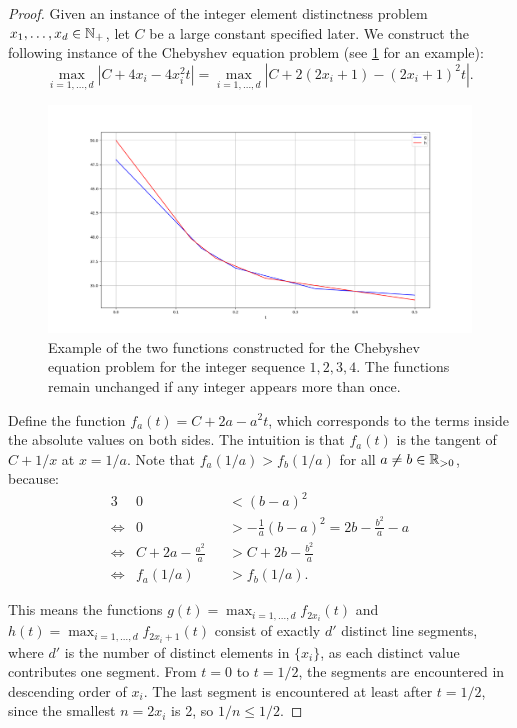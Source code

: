 \begin{proof}
	Given an instance of the integer element distinctness problem \(x_1, \dots, x_d \in \mathbb{N}_+\), let \(C\) be a large constant specified later. We construct the following instance of the Chebyshev equation problem (see \cref{fig:chebyshev-eq-red} for an example):
	\begin{equation}\label{eq:red-eq-chebyshev}
		\max_{i=1, \dots, d} |C + 4x_i - 4x_i^2 t| = \max_{i=1, \dots, d} |C + 2(2x_i + 1) - (2x_i+1)^2 t|.
	\end{equation}

	\begin{figure}
		\centering
		\includegraphics[scale=1, width=0.9\linewidth]{figures/chebyshev-eq-red.png}
		\caption{Example of the two functions constructed for the Chebyshev equation problem for the integer sequence \(1, 2, 3, 4\). The functions remain unchanged if any integer appears more than once.}
		\label{fig:chebyshev-eq-red}
	\end{figure}


	Define the function \(f_a(t) = C + 2a - a^2 t\), which corresponds to the terms inside the absolute values on both sides. The intuition is that \(f_a(t)\) is the tangent of \(C + 1/x\) at \(x = 1/a\). Note that \(f_a(1/a) > f_b(1/a)\) for all \(a \neq b \in \mathbb{R}_{> 0}\), because:
	\begin{alignat*}{3}
		& 0 &&< (b-a)^2 \\
		\iff & 0 &&> -\frac{1}{a}(b-a)^2 = 2b - \frac{b^2}{a} - a \\
		\iff & C + 2a - \frac{a^2}{a} &&> C + 2b - \frac{b^2}{a} \\
		\iff & f_a(1/a) &&> f_b(1/a).
	\end{alignat*}

	This means the functions \(g(t) = \max_{i=1,\dots, d} f_{2x_i}(t)\) and \(h(t) = \max_{i=1,\dots, d} f_{2x_i+1}(t)\) consist of exactly \(d'\) distinct line segments, where \(d'\) is the number of distinct elements in \(\{x_i\}\), as each distinct value contributes one segment. From \(t=0\) to \(t=1/2\), the segments are encountered in descending order of \(x_i\). The last segment is encountered at least after \(t=1/2\), since the smallest \(n = 2x_i\) is 2, so \(1/n \leq 1/2\).


\end{proof}
